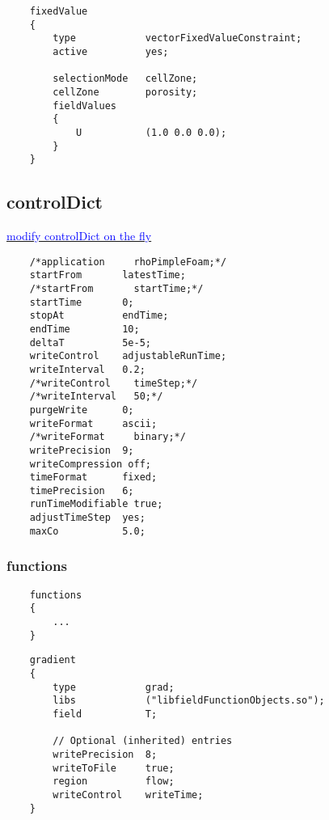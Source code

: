 \documentclass[a4paper, 12pt]{article}
\numberwithin{equation}{section}
\newcommand{\blue}[1]{\textcolor{blue}{#1}}
\begin{document}
    \begin{minipage}{\textwidth}
    \vspace{12pt}
    {
    \begin{verbatim}
    fixedValue
    {
        type            vectorFixedValueConstraint;
        active          yes;

        selectionMode   cellZone;
        cellZone        porosity;
        fieldValues
        {
            U           (1.0 0.0 0.0);
        }
    }
    \end{verbatim}
    }
    \end{minipage}

    \subsection{controlDict}

    \href{https://www.cfd-online.com/Forums/openfoam-solving/128713-varying-time-step.html}{\blue{modify controlDict on the fly}}

    {
    \begin{verbatim}
    /*application     rhoPimpleFoam;*/
    startFrom       latestTime;
    /*startFrom       startTime;*/
    startTime       0;
    stopAt          endTime;
    endTime         10;
    deltaT          5e-5;
    writeControl    adjustableRunTime;
    writeInterval   0.2;
    /*writeControl    timeStep;*/
    /*writeInterval   50;*/
    purgeWrite      0;
    writeFormat     ascii;
    /*writeFormat     binary;*/
    writePrecision  9;
    writeCompression off;
    timeFormat      fixed;
    timePrecision   6;
    runTimeModifiable true;
    adjustTimeStep  yes;
    maxCo           5.0;
    \end{verbatim}
    }

        \subsubsection{functions}
    {
    \begin{verbatim}
    functions
    {
        ...
    }
    \end{verbatim}
    }

    \begin{minipage}{\textwidth}
    {
    \begin{verbatim}
    gradient
    {
        type            grad;
        libs            ("libfieldFunctionObjects.so");
        field           T;

        // Optional (inherited) entries
        writePrecision  8;
        writeToFile     true;
        region          flow;
        writeControl    writeTime;
    }
    \end{verbatim}
    }
    \end{minipage}
\end{document}
